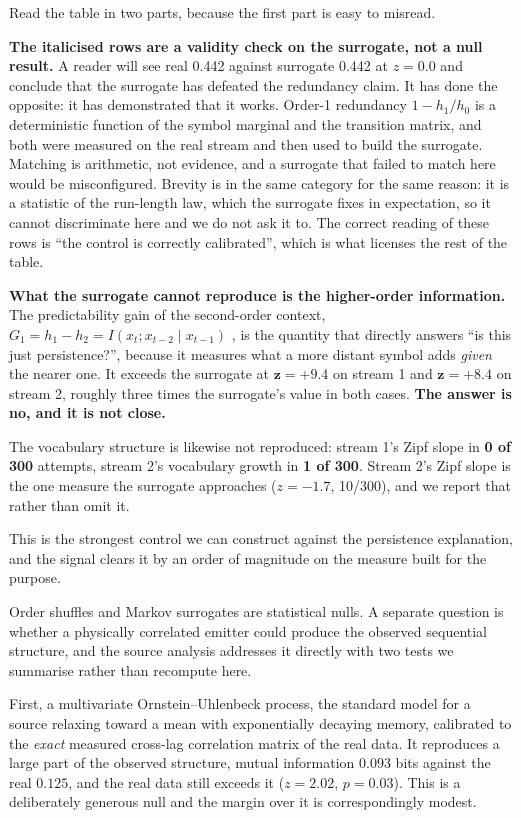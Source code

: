 \documentclass[11pt,a4paper]{article}
\newcommand{\bnum}[1]{\textbf{#1}}
\begin{document}
Read the table in two parts, because the first part is easy to misread.

\textbf{The italicised rows are a validity check on the surrogate, not a null result.} A
reader will see real 0.442 against surrogate 0.442 at $z = 0.0$ and conclude that the
surrogate has defeated the redundancy claim. It has done the opposite: it has demonstrated
that it works. Order-1 redundancy $1 - h_1/h_0$ is a deterministic function of the symbol
marginal and the transition matrix, and both were measured on the real stream and then
used to build the surrogate. Matching is arithmetic, not evidence, and a surrogate that
failed to match here would be misconfigured. Brevity is in the same category for the same
reason: it is a statistic of the run-length law, which the surrogate fixes in
expectation, so it cannot discriminate here and we do not ask it to. The correct
reading of these rows is ``the control is correctly calibrated'', which is what licenses
the rest of the table.

\textbf{What the surrogate cannot reproduce is the higher-order information.} The
predictability gain of the second-order context,
$G_1 = h_1 - h_2 = I(x_t; x_{t-2} \mid x_{t-1})$ \cite{degregorio2026}, is
the quantity that directly answers ``is this just persistence?'', because it measures
what a more distant symbol adds \emph{given} the nearer one. It exceeds the surrogate at
$\mathbf{z = +9.4}$ on stream 1 and $\mathbf{z = +8.4}$ on stream 2, roughly three times
the surrogate's value in both cases. \textbf{The answer is no, and it is not close.}

The vocabulary structure is likewise not reproduced: stream 1's Zipf slope in
\bnum{0 of 300} attempts, stream 2's vocabulary growth in \bnum{1 of 300}. Stream 2's
Zipf slope is the one measure the surrogate approaches ($z = -1.7$, 10/300), and we
report that rather than omit it.

This is the strongest control we can construct against the persistence explanation, and
the signal clears it by an order of magnitude on the measure built for the purpose.

Order shuffles and Markov surrogates are statistical nulls. A separate question is
whether a physically correlated emitter could produce the observed sequential
structure, and the source analysis \cite{meucci2026} addresses it directly with two
tests we summarise rather than recompute here.

First, a multivariate Ornstein--Uhlenbeck process, the standard model for a source
relaxing toward a mean with exponentially decaying memory, calibrated to the
\emph{exact} measured cross-lag correlation matrix of the real data. It reproduces a
large part of the observed structure, mutual information $0.093$ bits against the real
$0.125$, and the real data still exceeds it ($z = 2.02$, $p = 0.03$). This is a
deliberately generous null and the margin over it is correspondingly modest.
\end{document}
